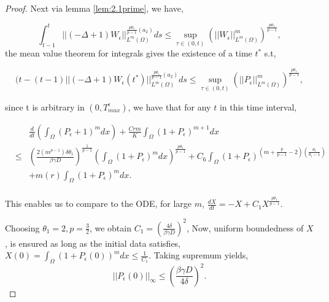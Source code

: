 \documentclass[10pt,a4paper]{amsart}
\begin{document}
\begin{proof}
Next via lemma \ref{lem:2.1prime}, we have,

\begin{equation}
    \int^{t}_{t-1}||(-\Delta + 1)W_{\epsilon}||^{\frac{p\theta_{1}}{p-1}(a_{2})}_{L^{m}(\Omega)}ds \leq \sup_{\tau \in (0,t)}\left(||W_{\epsilon}||^{m}_{L^{m}(\Omega)}\right)^{\frac{p\theta_{1}}{p-1}},
\end{equation}
the mean value theorem for integrals gives the existence of a time $t^{*}$ s.t,

\begin{equation}
    (t-(t-1)||(-\Delta + 1)W_{\epsilon}(t^{*})||^{\frac{p\theta_{1}}{p-1}(a_{2})}_{L^{m}(\Omega)}ds \leq \sup_{\tau \in (0,t)}\left(||P_{\epsilon}||^{m}_{L^{m}(\Omega)}\right)^{\frac{p\theta_{1}}{p-1}},
\end{equation}

since t is arbitrary in $(0,T^{\epsilon}_{max})$, we have that for any $t$ in this time interval,


\begin{eqnarray}
   && \frac{d}{dt}\left(\int_{\Omega} (P_{\epsilon} +1)^{m}dx\right)+ \frac{Crm}{K}\int_{\Omega} (1+P_{\epsilon})^{m+1} dx \nonumber \\ 
&\leq&  \left(\frac{2 (m^{p-1})\delta\theta_{1}}{\beta \gamma D}\right)^{\frac{1}{p-1}}\left(\int_{\Omega} (1+P_{\epsilon})^{m} dx \right)^{\frac{p\theta_{1}}{p-1}} + C_{6}\int_{\Omega} (1+P_{\epsilon})^{\left(m+\frac{p}{p-1}-2\right)\left(\frac{\theta_{1}}{\theta_{1}-1}\right)} \nonumber \\
&& + m(r)\int_{\Omega} (1+P_{\epsilon})^{m}dx . \nonumber \\
        \end{eqnarray}

This enables us to compare to the ODE, for large $m$,
$\frac{dX}{dt} =- X + C_{1}X^{\frac{p\theta_{1}}{p-1}} $.

Choosing $\theta_{1}=2, p=\frac{3}{2}$, we obtain $C_{1} = (\frac{4 \delta}{\beta \gamma D})^{2}$,
Now, uniform boundedness of $X$, is ensured as long as the initial data satisfies, $X(0)=\int_{\Omega} (1+P_{\epsilon}(0))^{m} dx \leq \frac{1}{C_{1}}$. Taking supremum yields,
\begin{equation}
\boxed{||P_{\epsilon}(0)||_{\infty} \leq \left(\frac{\beta \gamma D}{4 \delta}\right)^{2}.}
\end{equation}
\end{proof}
\end{document}
